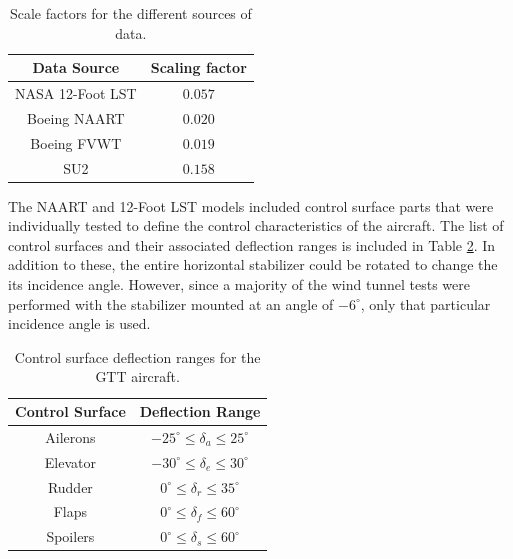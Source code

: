 \begin{table}
\centering
    \renewcommand{\arraystretch}{1.2}
    \captionsetup{justification=centering}
    \begin{tabular}{|c|c|}
        \hline
        Data Source & Scaling factor \\ \hline
        NASA 12-Foot LST & $0.057$ \\ \hline
        Boeing NAART & $0.020$ \\ \hline
        Boeing FVWT & $0.019$ \\ \hline
        SU2 & $0.158$\\ \hline
    \end{tabular}
    \caption{Scale factors for the different sources of data.}
    \label{tab:gtt_scale_factors}
\end{table}

The NAART and 12-Foot LST models included control surface parts that were individually tested to define the control characteristics of the aircraft. 
The list of control surfaces and their associated deflection ranges is included in Table \ref{tab:gtt_cs_range}.
In addition to these, the entire horizontal stabilizer could be rotated to change the its incidence angle. 
However, since a majority of the wind tunnel tests were performed with the stabilizer mounted at an angle of $-6^\circ$, only that particular incidence angle is used.

\begin{table}
    \renewcommand{\arraystretch}{1.2}
    \centering
    \begin{tabular}{ |c|c| } 
        \hline
        Control Surface & Deflection Range \\ \hline
         Ailerons &  $-25^\circ \leq \delta_a \leq 25^\circ$ \\ \hline
         Elevator &  $-30^\circ \leq \delta_e \leq 30^\circ$ \\ \hline
         Rudder & $0^\circ \leq \delta_r \leq 35^\circ$ \\ \hline
         Flaps & $0^\circ \leq \delta_f \leq 60^\circ$ \\ \hline
         Spoilers & $0^\circ \leq \delta_s \leq 60^\circ$ \\ \hline
    \end{tabular}
    \caption{Control surface deflection ranges for the GTT aircraft.}
    \label{tab:gtt_cs_range}
\end{table}

